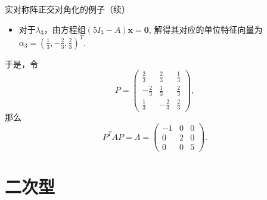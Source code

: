 
\begin{frame}

\begin{block}{实对称阵正交对角化的例子（续）}
\begin{itemize}
\item 对于$\lambda_3$，由方程组$(5I_3 - A) \mathbf{x} = \mathbf{0}$, 解得其对应的单位特征向量为$\alpha_3 = (\frac{1}{3},-\frac{2}{3},\frac{2}{3})^T$.
\end{itemize}

\vspace{2em}

于是，令
\[P = \begin{pmatrix} \frac{2}{3} & \frac{2}{3} & \frac{1}{3} \\ -\frac{2}{3} & \frac{1}{3} & \frac{2}{3} \\
\frac{1}{3} & -\frac{2}{3} & \frac{2}{3} \end{pmatrix},\]
那么
\[
P^TAP = \Lambda = \begin{pmatrix} -1 & 0 & 0 \\ 0 & 2 & 0 \\ 0 & 0 & 5 \end{pmatrix}.
\]
\end{block}

\end{frame}


\section{二次型}



